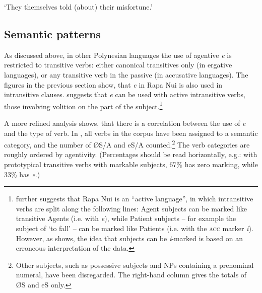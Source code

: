 \glt 
‘They themselves told (about) their misfortune.’ \textstyleExampleref{[R361.035]} 
\z

\subsection[Semantic patterns]{Semantic patterns}\label{sec:8.3.1.2}

As discussed above, in other Polynesian languages the use of agentive \textit{e} is restricted to transitive verbs: either canonical transitives only (in ergative languages), or any transitive verb in the passive (in accusative languages). The figures in the previous section show, that \textit{e} in Rapa Nui is also used in intransitive clauses. \citet[143]{Alexander1981OL} suggests that \textit{e} can be used with active intransitive verbs, those involving volition on the part of the subject.\footnote{\label{fn:393}\citet[145]{Alexander1981OL} further suggests that Rapa Nui is an “active language”, in which intransitive verbs are split along the following lines: Agent subjects can be marked like transitive Agents (i.e. with \textit{e}), while Patient subjects – for example the subject of ‘to fall’ – can be marked like Patients (i.e. with the \textsc{acc} marker \textit{i}). However, as \citet[40]{WeberN2003} shows, the idea that subjects can be \textit{i}{}-marked is based on an erroneous interpretation of the data.} 

A more refined analysis shows, that there is a correlation between the use of \textit{e} and the type of verb. In , all verbs in the corpus have been assigned to a semantic category, and the number of ØS/A and eS/A counted.\footnote{\label{fn:394}Other subjects, such as possessive subjects and NPs containing a prenominal numeral, have been disregarded. The right-hand column gives the totals of ØS and eS only.} The verb categories are roughly ordered by agentivity. (Percentages should be read horizontally, e.g.: with prototypical transitive verbs with markable subjects, 67\% has zero marking, while 33\% has \textit{e}.)

